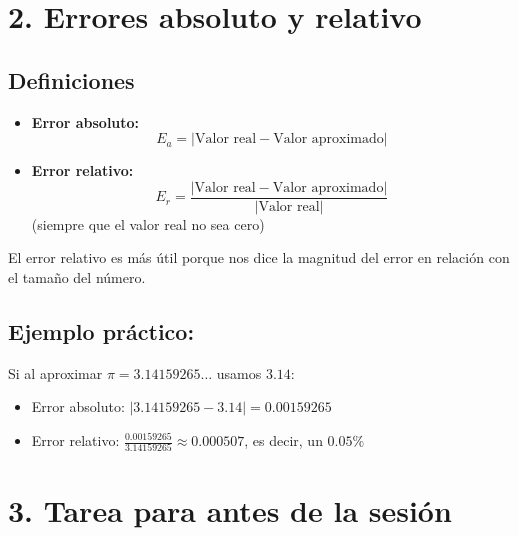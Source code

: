 \documentclass[12pt,letterpaper]{article}
\begin{document}
\begin{center}
\end{center}

\section*{2. Errores absoluto y relativo}

\subsection*{Definiciones}

\begin{itemize}
    \item \textbf{Error absoluto:} 
    \[
    E_a = |\text{Valor real} - \text{Valor aproximado}|
    \]
    \item \textbf{Error relativo:}
    \[
    E_r = \frac{|\text{Valor real} - \text{Valor aproximado}|}{|\text{Valor real}|}
    \]
    (siempre que el valor real no sea cero)
\end{itemize}

El error relativo es más útil porque nos dice la magnitud del error en relación con el tamaño del número.

\subsection*{Ejemplo práctico:}
Si al aproximar $\pi = 3.14159265\ldots$ usamos $3.14$:
\begin{itemize}
    \item Error absoluto: $|3.14159265 - 3.14| = 0.00159265$
    \item Error relativo: $\frac{0.00159265}{3.14159265} \approx 0.000507$, es decir, un $0.05\%$
\end{itemize}

\section*{3. Tarea para antes de la sesión}
\end{document}
